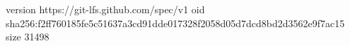 version https://git-lfs.github.com/spec/v1
oid sha256:f2ff760185fe5c51637a3cd91dde017328f2058d05d7dcd8bd2d3562e9f7ac15
size 31498

